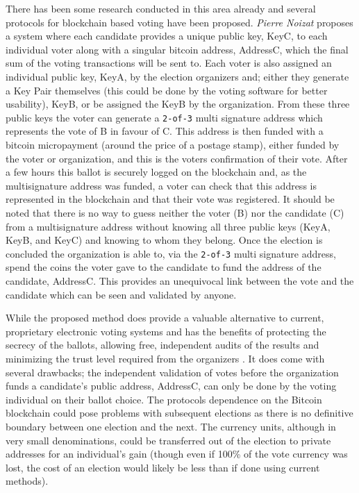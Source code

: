 \documentclass{article}
\begin{document}
There has been some research conducted in this area already and several protocols for blockchain based voting have been proposed. \textit{Pierre Noizat} proposes a system \citep{3_noizat_2016} where each candidate provides a unique public key, KeyC, to each individual voter along with a singular bitcoin address, AddressC, which the final sum of the voting transactions will be sent to. Each voter is also assigned an individual public key, KeyA, by the election organizers and; either they generate a Key Pair themselves (this could be done by the voting software for better usability), KeyB, or be assigned the KeyB by the organization. From these three public keys the voter can generate a \verb|2-of-3| multi signature address which represents the vote of B in favour of C. This address is then funded with a bitcoin micropayment (around the price of a postage stamp), either funded by the voter or organization, and this is the voters confirmation of their vote. After a few hours this ballot is securely logged on the blockchain and, as the multisignature address was funded, a voter can check that this address is represented in the blockchain and that their vote was registered. It should be noted that there is no way to guess neither the voter (B) nor the candidate (C) from a multisignature address without knowing all three public keys (KeyA, KeyB, and KeyC) and knowing to whom they belong. Once the election is concluded the organization is able to, via the \verb|2-of-3| multi signature address, spend the coins the voter gave to the candidate to fund the address of the candidate, AddressC. This provides an unequivocal link between the vote and the candidate which can be seen and validated by anyone.

While the proposed method does provide a valuable alternative to current, proprietary electronic voting systems and has the benefits of protecting the secrecy of the ballots, allowing free, independent audits of the results and minimizing the trust level required from the organizers \citep{3_noizat_2016}. It does come with several drawbacks; the independent validation of votes before the organization funds a candidate's public address, AddressC, can only be done by the voting individual on their ballot choice. The protocols dependence on the Bitcoin blockchain could pose problems with subsequent elections as there is no definitive boundary between one election and the next. The currency units, although in very small denominations, could be transferred out of the election to private addresses for an individual's gain (though even if 100\% of the vote currency was lost, the cost of an election would likely be less than if done using current methods).
\end{document}
